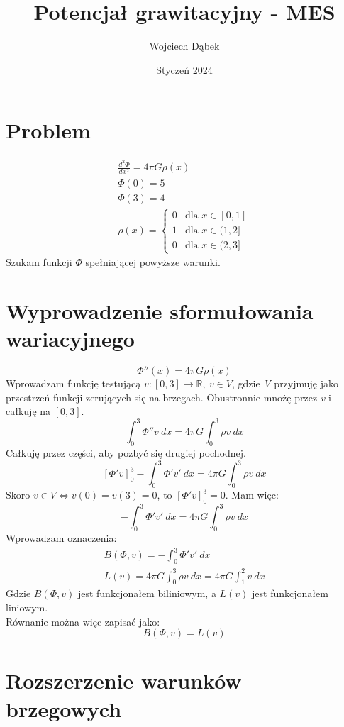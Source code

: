 \documentclass{article}
\title{Potencjał grawitacyjny - MES}
\author{Wojciech Dąbek}
\date{Styczeń 2024}
\begin{document}
\maketitle

\section{Problem}

\begin{gather*}
    \frac{d^2 \Phi}{dx^2} = 4 \pi G \rho(x)\\
    \Phi(0) = 5\\
    \Phi(3) = 4\\
    \rho(x) =
    \begin{cases}
        0 & \text{dla } x \in [0,1]\\
        1 & \text{dla } x \in (1,2]\\
        0 & \text{dla } x \in (2,3]
    \end{cases}
\end{gather*}
Szukam funkcji \textit{$\Phi$} spełniającej powyższe warunki.

\section{Wyprowadzenie sformułowania wariacyjnego}

\[\Phi''(x) = 4 \pi G \rho(x)\]
Wprowadzam funkcję testującą \(v: [0,3] \to \mathbb{R},\ v \in V\), gdzie \textit{V} przyjmuję jako przestrzeń funkcji zerujących się na brzegach.
Obustronnie mnożę przez \textit{v} i całkuję na \([0,3]\).
\[\int_0^3 \Phi'' v\ dx = 4 \pi G \int_0^3 \rho v\ dx\]
Całkuję przez części, aby pozbyć się drugiej pochodnej.
\[[\Phi' v]_0^3 - \int_0^3 \Phi' v'\ dx = 4 \pi G \int_0^3 \rho v\ dx\]
Skoro \(v \in V \Leftrightarrow v(0) = v(3) = 0\), to \([\Phi' v]_0^3 = 0\). Mam więc:
\[-\int_0^3 \Phi' v'\ dx = 4 \pi G \int_0^3 \rho v\ dx\]
Wprowadzam oznaczenia:
\begin{gather*}
    B(\Phi, v) = -\int_0^3 \Phi' v'\ dx\\
    L(v) = 4 \pi G \int_0^3 \rho v\ dx = 4 \pi G \int_1^2 v\ dx
\end{gather*}
Gdzie \(B(\Phi, v)\) jest funkcjonałem biliniowym, a \(L(v)\) jest funkcjonałem liniowym.\\
Równanie można więc zapisać jako:
\[B(\Phi, v) = L(v)\]

\section{Rozszerzenie warunków brzegowych}
\end{document}
